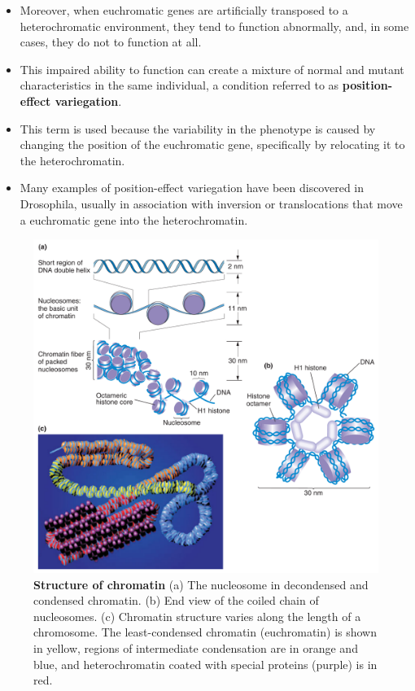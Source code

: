 \documentclass[11pt,dvipsnames,ignorenonframetext,aspectratio=169]{beamer}
\providecommand{\tightlist}{%
  \setlength{\itemsep}{0pt}\setlength{\parskip}{0pt}}
\begin{document}
\begin{frame}{}
\protect\hypertarget{section-9}{}

\begin{itemize}
\tightlist
\item
  Moreover, when euchromatic genes are artificially transposed to a
  heterochromatic environment, they tend to function abnormally, and, in
  some cases, they do not to function at all.
\item
  This impaired ability to function can create a mixture of normal and
  mutant characteristics in the same individual, a condition referred to
  as \textbf{position-effect variegation}.
\item
  This term is used because the variability in the phenotype is caused
  by changing the position of the euchromatic gene, specifically by
  relocating it to the heterochromatin.
\item
  Many examples of position-effect variegation have been discovered in
  Drosophila, usually in association with inversion or translocations
  that move a euchromatic gene into the heterochromatin.
\end{itemize}

\end{frame}

\begin{frame}{}
\protect\hypertarget{section-10}{}

\begin{figure}

{\centering \includegraphics[width=0.45\linewidth]{../images/structure_of_chromatin} 

}

\caption{\textbf{Structure of chromatin} \newline (a) The nucleosome in decondensed and condensed chromatin. (b) End view of the coiled chain of nucleosomes. (c) Chromatin structure varies along the length of a chromosome. The least-condensed chromatin (euchromatin) is shown in yellow, regions of intermediate condensation are in orange and blue, and heterochromatin coated with special proteins (purple) is in red.}\label{fig:structure-of-chromatin}
\end{figure}

\end{frame}
\end{document}
